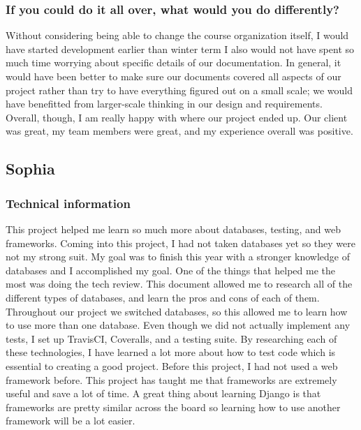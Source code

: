 \documentclass[onecolumn, draftclsnofoot,10pt, compsoc]{IEEEtran}
\begin{document}
\begin{flushleft}
\subsubsection{If you could do it all over, what would you do differently?}
Without considering being able to change the course organization itself, I would have started development earlier than winter term I also would not have spent so much time worrying about specific details of our documentation. In general, it would have been better to make sure our documents covered all aspects of our project rather than try to have everything figured out on a small scale; we would have benefitted from larger-scale thinking in our design and requirements.
Overall, though, I am really happy with where our project ended up. Our client was great, my team members were great, and my experience overall was positive.
 
\subsection{Sophia}
\subsubsection{Technical information}
This project helped me learn so much more about databases, testing, and web frameworks. Coming into this project, I had not taken databases yet so they were not my strong suit. My goal was to finish this year with a stronger knowledge of databases and I accomplished my goal. One of the things that helped me the most was doing the tech review. This document allowed me to research all of the different types of databases, and learn the pros and cons of each of them. Throughout our project we switched databases, so this allowed me to learn how to use more than one database.
Even though we did not actually implement any tests, I set up TravisCI, Coveralls, and a testing suite. By researching each of these technologies, I have learned a lot more about how to test code which is essential to creating a good project. 
Before this project, I had not used a web framework before. This project has taught me that frameworks are extremely useful and save a lot of time. A great thing about learning Django is that frameworks are pretty similar across the board so learning how to use another framework will be a lot easier.

\end{flushleft}
\end{document}
